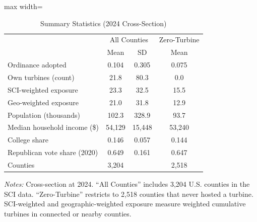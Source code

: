 \begin{table}[htbp]
\centering
\caption{Summary Statistics (2024 Cross-Section)}
\label{tab:summary}
\begin{adjustbox}{max width=\textwidth}
\begin{threeparttable}
\begin{tabular}{lccc}
\toprule
 & \multicolumn{2}{c}{All Counties} & Zero-Turbine \\
 & Mean & SD & Mean \\
\midrule
Ordinance adopted & 0.104 & 0.305 & 0.075 \\
Own turbines (count) & 21.8 & 80.3 & 0.0 \\
SCI-weighted exposure & 23.3 & 32.5 & 15.5 \\
Geo-weighted exposure & 21.0 & 31.8 & 12.9 \\
Population (thousands) & 102.3 & 328.9 & 93.7 \\
Median household income (\$) & 54,129 & 15,448 & 53,240 \\
College share & 0.146 & 0.057 & 0.144 \\
Republican vote share (2020) & 0.649 & 0.161 & 0.647 \\
\midrule
Counties & 3,204 & & 2,518 \\
\bottomrule
\end{tabular}
\begin{tablenotes}[flushleft]
\small
\item \textit{Notes:} Cross-section at 2024. ``All Counties'' includes 3,204 U.S. counties in the SCI data. ``Zero-Turbine'' restricts to 2,518 counties that never hosted a turbine. SCI-weighted and geographic-weighted exposure measure weighted cumulative turbines in connected or nearby counties.
\end{tablenotes}
\end{threeparttable}
\end{adjustbox}
\end{table}
